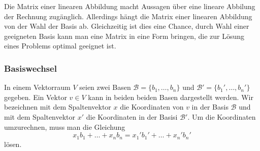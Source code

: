 Die Matrix einer linearen Abbildung macht Aussagen über eine lineare
Abbilung der Rechnung zugänglich.
Allerdings hängt die Matrix einer linearen Abbildung von der Wahl der
Basis ab.
Gleichzeitig ist dies eine Chance, durch Wahl einer geeigneten Basis
kann man eine Matrix in eine Form bringen, die zur Lösung eines
Problems optimal geeignet ist.

\subsubsection{Basiswechsel}
In einem Vektorraum $V$ seien zwei Basen $\mathcal{B}=\{b_1,\dots,b_n\}$
und $\mathcal{B}'=\{b_1',\dots,b_n'\}$ gegeben.
Ein Vektor $v\in V$ kann in beiden beiden Basen dargestellt werden.
Wir bezeichnen mit dem Spaltenvektor $x$ die Koordinaten von $v$ in der
Basis $\mathcal{B}$ und mit dem Spaltenvektor $x'$ die Koordinaten
in der Basisi $\mathcal{B}'$.
Um die Koordinaten umzurechnen, muss man die Gleichung
\begin{equation}
x_1b_1 + \dots + x_nb_n = x_1'b_1' + \dots + x_n'b_n'
\label{buch:vektoren-und-matrizen:eqn:basiswechselgleichung}
\end{equation}
lösen.

